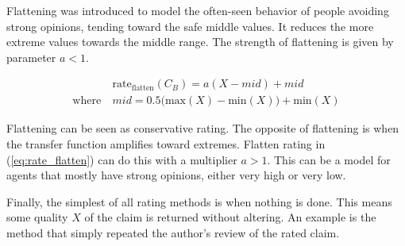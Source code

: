 \documentclass[%
    ]{\PathToTumTemplate/thesis/tum_thesis}
\begin{document}
Flattening was introduced to model the often-seen behavior of people avoiding strong opinions, tending toward the safe middle values.
It reduces the more extreme values towards the middle range.
The strength of flattening is given by parameter $a < 1$.

\begin{equation}\label{eq:rate_flatten}
\begin{aligned}
&\mathrm{rate_{flatten}}(C_B) = a(X-mid)+mid \\
\mathrm{where~}&mid = 0.5\big(\mathrm{max}(X) - \mathrm{min}(X) \big) + \mathrm{min}(X)
\end{aligned}
\end{equation}

Flattening can be seen as conservative rating.
The opposite of flattening is when the transfer function amplifies toward extremes.
Flatten rating in (\ref{eq:rate_flatten}) can do this with a multiplier $a > 1$.
This can be a model for agents that mostly have strong opinions, either very high or very low.

Finally, the simplest of all rating methods is when nothing is done.
This means some quality $X$ of the claim is returned without altering.
An example is the method that simply repeated the author's review of the rated claim.
\end{document}
